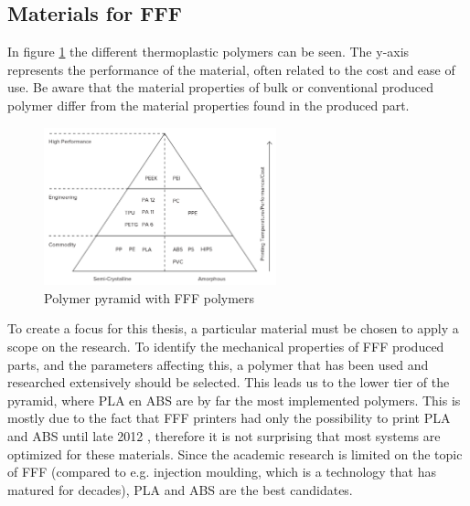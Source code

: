\subsection{Materials for FFF}
In figure \ref{fig:pyramidpolymer} the different thermoplastic polymers can be seen. The y-axis represents the performance of the material, often related to the cost and ease of use. Be aware that the material properties of bulk or conventional produced polymer differ from the material properties found in the produced part. 

\begin{figure}[H]
    \centering
    \includegraphics[width=0.6\textwidth]{chapter_2/figures/Pyramidpolymer.png}
    \caption{Polymer pyramid with FFF polymers \cite{3DHubsIntroductionPrinting}}
    \label{fig:pyramidpolymer}
\end{figure}

To create a focus for this thesis, a particular material must be chosen to apply a scope on the research. To identify the mechanical properties of FFF produced parts, and the parameters affecting this, a polymer that has been used and researched extensively should be selected. This leads us to the lower tier of the pyramid, where PLA en ABS are by far the most implemented polymers. This is mostly due to the fact that FFF printers had only the possibility to print PLA and ABS until late 2012 \cite{WohlersAssociates2017WohlersIndustry}, therefore it is not surprising that most systems are optimized for these materials. Since the academic research is limited on the topic of FFF (compared to e.g. injection moulding, which is a technology that has matured for decades), PLA and ABS are the best candidates.

